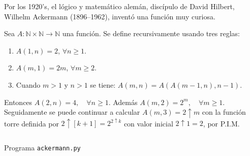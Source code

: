 \begin{frame}
Por los 1920's, el lógico y matemático alemán, discípulo de David Hilbert, Wilhelm Ackermann (1896–1962), inventó una función muy curiosa.

\begin{minipage}{0.45\paperwidth}
	\begin{definition}[Ackermann]
		Sea $A\colon\mathds{N}\times\mathds{N}\rightarrow\mathds{N}$ una función. Se define recursivamente usando tres reglas:
		\begin{enumerate}
			\item $A(1,n)=2$, $\forall n\geq 1$.
			\item $A(m,1)=2m$, $\forall m\geq 2$.
			\item Cuando $m>1$ y $n>1$ se tiene: $A\left(m,n\right)=A\left(A(m-1,n),n-1\right)$.
		\end{enumerate}
	\end{definition}
	\begin{remark}
		Entonces $A\left(2,n\right)=4,\quad\forall n\geq1$. Además $A\left(m,2\right)=2^{m},\quad\forall m\geq 1$. Seguidamente se puede continuar a calcular $A\left(m,3\right)=2\uparrow m$ con la función torre definida por $2\uparrow\left[k+1\right]=2^{2\uparrow k}$ con valor inicial $2\uparrow 1=2$, por P.I.M.
	\end{remark}
\end{minipage}
\hfill
\begin{minipage}{0.45\paperwidth}
	\begin{listing}[H]
		\inputminted{python}{./code/ackermann.py}
		\caption{Programa \texttt{ackermann.py}}
	\end{listing}
\end{minipage}

\end{frame}